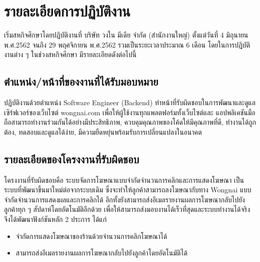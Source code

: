 \chapter{รายละเอียดการปฏิบัติงาน}
\label{chapter:working-detail}

เริ่มสหกิจศึกษาโดยปฏิบัติงานที่ บริษัท วงใน มีเดีย จำกัด (สำนักงานใหญ่) ตั้งแต่วันที่ 4 มิถุนายน พ.ศ.2562 จนถึง 29 พฤศจิกายน พ.ศ.2562 รวมเป็นระยะเวลาประมาณ 6 เดือน โดยในการปฏิบัติงานต่าง ๆ ในช่วงสหกิจศึกษา มีรายละเอียดดังต่อไปนี้

\section{ตำแหน่ง/หน้าที่ของงานที่ได้รับมอบหมาย}
ปฏิบัติงานด้วยตำแหน่ง Software Engineer (Backend) ทำหน้าที่รับผิดชอบในการพัฒนาและดูแลเซิร์ฟเวอร์ของเว็บไซต์ wongnai.com เพื่อให้ผู้ใช้งานทุกแพลตฟอร์มทั้งเว็บไซต์และ แอปพลิเคชันมือถือสามารถทำงานร่วมกันได้อย่างมีประสิทธิภาพ, ควบคุมคุณภาพของโค้ดให้มีคุณภาพที่ดี, ทำงานได้ถูกต้อง, ทดสอบและดูแลได้ง่าย, มีความยืดหยุ่นพร้อมรับการเปลี่ยนแปลงในอนาคต

\section{รายละเอียดของโครงงานที่รับผิดชอบ}
โครงงานที่รับผิดชอบคือ ระบบจัดการโฆษณาแบบจำกัดจำนวนการคลิกและการแสดงโฆษณา เป็นระบบที่พัฒนาขึ้นมาใหม่ต่อจากระบบเดิม ซึ่งจะทำให้ลูกค้าสามารถลงโฆษณากับทาง Wongnai แบบจำกัดจำนวนการแสดงผลและการคลิกได้ อีกทั้งยังสามารถส่งอีเมลรายงานผลการโฆษณากลับไปยังลูกค้าทุก ๆ สัปดาห์โดยอัตโนมัติอีกด้วย เพื่อให้สามารถส่งมอบงานได้เร็วที่สุดและระบบทำงานได้จริง จึงได้พัฒนาฟังก์ชันหลัก 2 ประการ ได้แก่
\begin{itemize}
	\item จำกัดการแสดงโฆษณาของร้านด้วยจำนวนการคลิกโฆษณาได้
	\item สามารถส่งอีเมลรายงานผลการโฆษณากลับไปยังลูกค้าโดยอัตโนมัติได้
\end{itemize}

